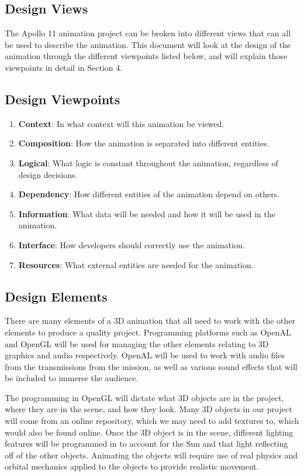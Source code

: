 \documentclass[onecolumn, draftclsnofoot,10pt, compsoc]{IEEEtran}
\begin{document}
\subsection{Design Views}
    The Apollo 11 animation project can be broken into different views that can all be used to describe the animation. This document will look at the design of the animation through the different viewpoints listed below, and will explain those viewpoints in detail in Section 4. 
    
    \subsection{Design Viewpoints}
    \begin{enumerate}
        \item \textbf{Context}: In what context will this animation be viewed.
        \item \textbf{Composition}: How the animation is separated into different entities.
        \item \textbf{Logical}: What logic is constant throughout the animation, regardless of design decisions.
        \item \textbf{Dependency}: How different entities of the animation depend on others.
        \item \textbf{Information}: What data will be needed and how it will be used in the animation. 
        \item \textbf{Interface}: How developers should correctly use the animation.
        \item \textbf{Resources}: What external entities are needed for the animation. 
    \end{enumerate}
    
    \subsection{Design Elements}
    There are many elements of a 3D animation that all need to work with the other elements to produce a quality project. Programming platforms such as OpenAL and OpenGL will be used for managing the other elements relating to 3D graphics and audio respectively. OpenAL will be used to work with audio files from the transmissions from the mission, as well as various sound effects that will be included to immerse the audience. 
    
    The programming in OpenGL will dictate what 3D objects are in the project, where they are in the scene, and how they look. Many 3D objects in our project will come from an online repository, which we may need to add textures to, which would also be found online. Once the 3D object is in the scene, different lighting features will be programmed in to account for the Sun and that light reflecting off of the other objects. Animating the objects will require use of real physics and orbital mechanics applied to the objects to provide realistic movement. 
\end{document}
